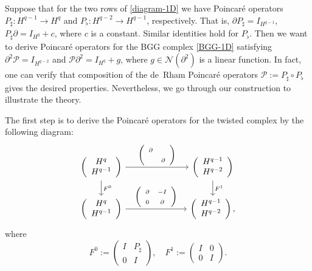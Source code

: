 \documentclass[11pt]{amsart}
\newcommand{\0}{\mathaccent23}
\renewcommand\ker{\mathcal{N}}
\begin{document}
Suppose that for the two rows of \eqref{diagram-1D} we have Poincar\'e operators $P_{\sharp}: H^{q-1}\to H^{q}$ and $P_{\flat}: H^{q-2}\to H^{q-1}$, respectively. That is, $\partial P_{\sharp}=I_{H^{q-1}}$, $P_{\sharp}\partial =I_{H^{q}}+c$, where $c$ is a constant. Similar identities hold for $P_{\flat}$. Then we want to derive Poincar\'e operators for the BGG complex \eqref{BGG-1D} satisfying $\partial^{2}\mathscr{P}=I_{H^{q-2}}$ and $\mathscr{P}\partial^{2}=I_{H^{q}}+g$, where $g\in \ker(\partial^{2})$ is a linear function.
In fact,   one can verify that composition of the de~Rham Poincar\'e operators $\mathscr{P}:=P_{\sharp}\circ P_{\flat}$ gives the desired properties. Nevertheless, we go through our construction to illustrate the theory. 

The first step is to derive the Poincar\'e operators for the twisted complex by the following diagram:
  \begin{equation} \label{twisted}
\begin{tikzcd}[ampersand replacement=\&, column sep=1in]
\left (
\begin{array}{c}
H^{q}\\
H^{q-1} 
\end{array}
\right )\arrow{d}{F^{0}} \arrow{r}{\left (
\begin{array}{cc}
\partial &\\
&\partial
\end{array}
\right ) } \&\left (
\begin{array}{c}
H^{q-1} \\
H^{q-2} 
\end{array}
\right )\arrow{d}{F^{1}}  
\\
\left (
\begin{array}{c}
H^{q}\\
H^{q-1} 
\end{array}
\right ) \arrow{r}{\left (
\begin{array}{cc}
\partial & -I\\
0&\partial
\end{array}
\right ) } \&\left (
\begin{array}{c}
H^{q-1} \\
H^{q-2} 
\end{array}
\right ),
 \end{tikzcd}
\end{equation}
where
$$F^{0}:=
\left (
\begin{array}{cc}
I & P_{\sharp}\\
0 & I
\end{array}
\right ), \quad 
F^{1}:=
\left (
\begin{array}{cc}
I & 0\\
0 & I
\end{array}
\right ).
$$
\end{document}
